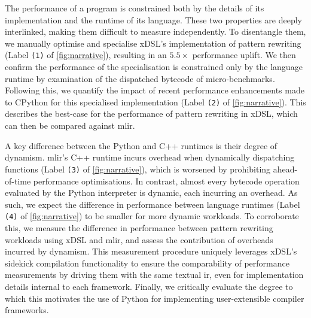 The performance of a program is constrained both by the details of its implementation and the runtime of its language.
These two properties are deeply interlinked, making them difficult to measure independently.
To disentangle them, we manually optimise and specialise xDSL's implementation of pattern rewriting (Label \texttt{(1)} of \autoref{fig:narrative}), resulting in an $5.5\times$ performance uplift. %
We then confirm the performance of the specialisation is constrained only by the language runtime by examination of the dispatched bytecode of micro-benchmarks.
Following this, we quantify the impact of recent performance enhancements made to CPython for this specialised implementation (Label \texttt{(2)} of \autoref{fig:narrative}). %
This describes the best-case for the performance of pattern rewriting in xDSL, which can then be compared against \ac{mlir}.




A key difference between the Python and C++ runtimes is their degree of dynamism.
\ac{mlir}'s C++ runtime incurs overhead when dynamically dispatching functions (Label \texttt{(3)} of \autoref{fig:narrative}), which is worsened by prohibiting ahead-of-time performance optimisations. In contrast, almost every bytecode operation evaluated by the Python interpreter is dynamic, each incurring an overhead.
As such, we expect the difference in performance between language runtimes (Label \texttt{(4)} of \autoref{fig:narrative}) to be smaller for more dynamic workloads.
To corroborate this, we measure the difference in performance between pattern rewriting workloads using xDSL and \ac{mlir}, and assess the contribution of overheads incurred by dynamism.
This measurement procedure uniquely leverages xDSL's sidekick compilation functionality to ensure the comparability of performance measurements by driving them with the same textual \ac{ir}, even for implementation details internal to each framework.
Finally, we critically evaluate the degree to which this motivates the use of Python for implementing user-extensible compiler frameworks.



